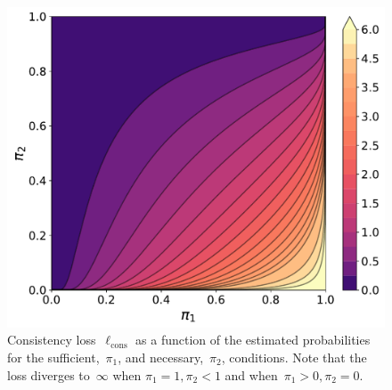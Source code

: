 
\begin{figure}
    \centering
    \includegraphics[width=0.5\linewidth]{Figures/Part2_Consist/02_logic/contour.pdf}
    \caption{Consistency loss~$\ell_\textrm{cons}$ as a function of the estimated probabilities for the sufficient,~$\pi_1$, and necessary,~$\pi_2$, conditions. Note that the loss diverges to~$\infty$ when $\pi_1=1, \pi_2<1$ and when~$\pi_1>0, \pi_2=0$.}
    \label{fig:loss}
\end{figure}

